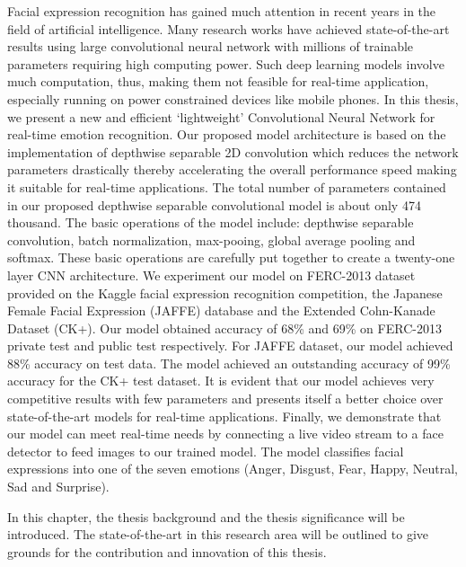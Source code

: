 \documentclass[master]{thesis-uestc}
\begin{document}
\begin{englishabstract}
Facial expression recognition has gained much attention in recent years in the field of artificial intelligence. Many research works have achieved state-of-the-art results using large convolutional neural network with millions of trainable parameters requiring high computing power. Such deep learning models involve much computation, thus, making them not feasible for real-time application, especially running on power constrained devices like mobile phones. In this thesis, we present a new and efficient `lightweight' Convolutional Neural Network for real-time emotion recognition. Our proposed model architecture is based on the implementation of depthwise separable 2D convolution which reduces the network parameters drastically thereby accelerating the overall performance speed making it suitable for real-time applications. The total number of parameters contained in our proposed depthwise separable convolutional model is about only 474 thousand. The basic operations of the model include: depthwise separable convolution, batch normalization, max-pooing, global average pooling and softmax. These basic operations are carefully put together to create a twenty-one layer CNN architecture. We experiment our model on FERC-2013 dataset provided on the Kaggle facial expression recognition competition, the Japanese Female Facial Expression (JAFFE) database and the Extended Cohn-Kanade Dataset (CK+). Our model obtained accuracy of 68\% and 69\% on FERC-2013 private test and public test respectively. For JAFFE dataset, our model achieved 88\% accuracy on test data. The model achieved an outstanding accuracy of 99\% accuracy for the CK+ test dataset. It is evident that our model achieves very competitive results with few parameters and presents itself a better choice over state-of-the-art models for real-time applications. Finally, we demonstrate that our model can meet real-time needs by connecting a live video stream to a face detector to feed images to our trained model. The model classifies facial expressions into one of the seven emotions (Anger, Disgust, Fear, Happy, Neutral, Sad and Surprise).


\end{englishabstract}

\thesistableofcontents

\thesischapterexordium

In this chapter, the thesis background and the thesis significance will be introduced. The state-of-the-art in this research area will be outlined to give grounds for the contribution and innovation of this thesis. 
\end{document}
